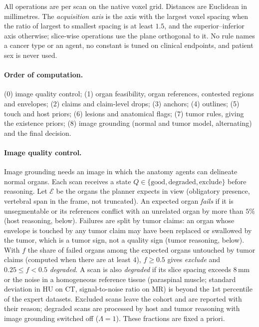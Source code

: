 \documentclass[fleqn,10pt]{olplainarticle}
\begin{document}
All operations are per scan on the native voxel grid. Distances are Euclidean in millimetres. The \emph{acquisition axis}
is the axis with the largest voxel spacing when the ratio of largest to smallest spacing is at least $1.5$, and the
superior--inferior axis otherwise; slice-wise operations use the plane orthogonal to it. No rule names a cancer type or an
agent, no constant is tuned on clinical endpoints, and patient sex is never used.

\paragraph{Order of computation.} (0) image quality control; (1) organ feasibility, organ references, contested regions and
envelopes; (2) claims and claim-level drops; (3) anchors; (4) outlines; (5) touch and host priors; (6) lesions and anatomical
flags; (7) tumor rules, giving the existence priors; (8) image grounding (normal and tumor model, alternating) and the final
decision.

\paragraph{Image quality control.}
\label{sec:qc_details}
Image grounding needs an image in which the anatomy agents can delineate normal organs. Each scan receives a state
$Q\in\{\text{good},\text{degraded},\text{exclude}\}$ before reasoning. Let $\mathcal{E}$ be the organs the planner expects in
view (obligatory presence, vertebral span in the frame, not truncated). An expected organ \emph{fails} if it is
unsegmentable or its references conflict with an unrelated organ by more than $5\%$ (host reasoning, below). Failures are
split by tumor claims: an organ whose envelope is touched by any tumor claim may have been replaced or swallowed by the
tumor, which is a tumor sign, not a quality sign (tumor reasoning, below). With $f$ the share of failed organs among the
expected organs untouched by tumor claims (computed when there are at least $4$), $f\ge0.5$ gives \emph{exclude} and
$0.25\le f<0.5$ \emph{degraded}. A scan is also \emph{degraded} if its slice spacing exceeds $8$\,mm or the noise in a
homogeneous reference tissue (paraspinal muscle; standard deviation in HU on CT, signal-to-noise ratio on MR) is beyond the
$1$st percentile of the expert datasets. Excluded scans leave the cohort and are reported with their reason; degraded scans
are processed by host and tumor reasoning with image grounding switched off ($\Lambda=1$). These fractions are fixed a priori.
\end{document}
